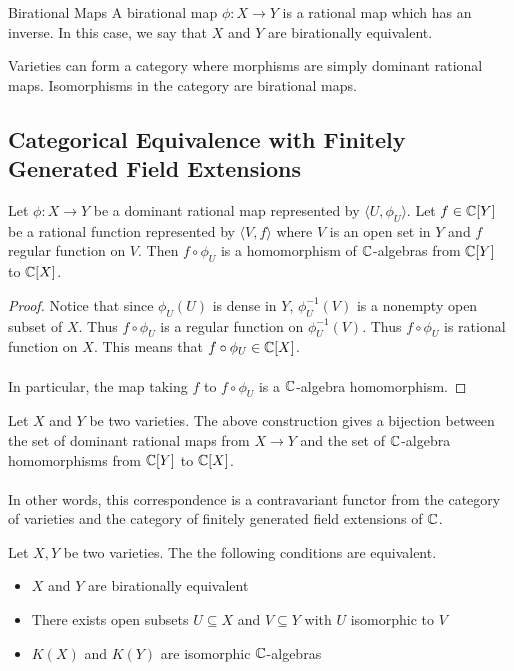 \documentclass[a4paper]{article}
\begin{document}
\begin{defn}{Birational Maps}{} A birational map $\phi:X\to Y$ is a rational map which has an inverse. In this case, we say that $X$ and $Y$ are birationally equivalent. 
\end{defn}

Varieties can form a category where morphisms are simply dominant rational maps. Isomorphisms in the category are birational maps. 

\subsection{Categorical Equivalence with Finitely Generated Field Extensions}
\begin{prp}{}{} Let $\phi:X\to Y$ be a dominant rational map represented by $\langle U,\phi_U\rangle$. Let $f\in \mathbb{C}[Y]$ be a rational function represented by $\langle V,f\rangle$ where $V$ is an open set in $Y$ and $f$ regular function on $V$. Then $f\circ\phi_U$ is a homomorphism of $\mathbb{C}$-algebras from $\mathbb{C}[Y]$ to $\mathbb{C}[X]$. \tcbline
\begin{proof}
Notice that since $\phi_U(U)$ is dense in $Y$, $\phi_U^{-1}(V)$ is a nonempty open subset of $X$. Thus $f\circ\phi_U$ is a regular function on $\phi_U^{-1}(V)$. Thus $f\circ\phi_U$ is rational function on $X$. This means that $f\circ\phi_U\in\mathbb{C}[X]$. \\~\\
In particular, the map taking $f$ to $f\circ\phi_U$ is a $\mathbb{C}$-algebra homomorphism. 
\end{proof}
\end{prp}

\begin{thm}{}{} Let $X$ and $Y$ be two varieties. The above construction gives a bijection between the set of dominant rational maps from $X\to Y$ and the set of $\mathbb{C}$-algebra homomorphisms from $\mathbb{C}[Y]$ to $\mathbb{C}[X]$. \\~\\
In other words, this correspondence is a contravariant functor from the category of varieties and the category of finitely generated field extensions of $\mathbb{C}$. 
\end{thm}

\begin{crl}{}{} Let $X,Y$ be two varieties. The the following conditions are equivalent. 
\begin{itemize}
\item $X$ and $Y$ are birationally equivalent
\item There exists open subsets $U\subseteq X$ and $V\subseteq Y$ with $U$ isomorphic to $V$
\item $K(X)$ and $K(Y)$ are isomorphic $\mathbb{C}$-algebras
\end{itemize}
\end{crl}
\end{document}
